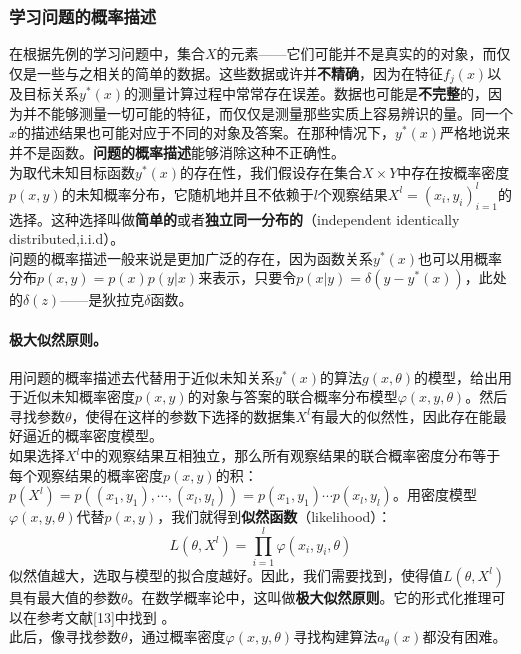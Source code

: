 \documentclass[a4paper,12pt]{ctexart}
\begin{document}
	\subsubsection{学习问题的概率描述}
	在根据先例的学习问题中，集合$X$的元素——它们可能并不是真实的的对象，而仅仅是一些与之相关的简单的数据。这些数据或许并\textbf{不精确}，因为在特征$f_j(x)$以及目标关系$y^*(x)$的测量计算过程中常常存在误差。数据也可能是\textbf{不完整}的，因为并不能够测量一切可能的特征，而仅仅是测量那些实质上容易辨识的量。同一个$x$的描述结果也可能对应于不同的对象及答案。在那种情况下，$y^*(x)$严格地说来并不是函数。\textbf{问题的概率描述}能够消除这种不正确性。\\
	\indent 为取代未知目标函数$y^*(x)$的存在性，我们假设存在集合$X\times Y$中存在按概率密度$p(x,y)$的未知概率分布，它随机地并且不依赖于$l$个观察结果$X^l=(x_i,y_i)_{i=1}^l$的选择。这种选择叫做\textbf{简单的}或者\textbf{独立同一分布的}（independent identically distributed,i.i.d）。\\
	\indent 问题的概率描述一般来说是更加广泛的存在，因为函数关系$y^*(x)$也可以用概率分布$p(x,y)=p(x)p(y|x)$来表示，只要令$p(x|y)=\delta(y-y^*(x))$，此处的$\delta(z)$——是狄拉克$\delta$函数。\\
	\paragraph{极大似然原则。}用问题的概率描述去代替用于近似未知关系$y^*(x)$的算法$g(x,\theta)$的模型，给出用于近似未知概率密度$p(x,y)$的对象与答案的联合概率分布模型$\varphi(x,y,\theta)$。然后寻找参数$\theta$，使得在这样的参数下选择的数据集$X^l$有最大的似然性，因此存在能最好逼近的概率密度模型。\\
	\indent 如果选择$X^l$中的观察结果互相独立，那么所有观察结果的联合概率密度分布等于每个观察结果的概率密度$p(x,y)$的积：$p(X^l)=p((x_1,y_1),\cdots,(x_l,y_l))=p(x_1,y_1)\cdots p(x_l,y_l)$。用密度模型$\varphi(x,y,\theta)$代替$p(x,y)$，我们就得到\textbf{似然函数}（likelihood）：
	$$
	L(\theta,X^l)=\prod_{i=1}^l\varphi(x_i,y_i,\theta)
	$$
	\indent 似然值越大，选取与模型的拟合度越好。因此，我们需要找到，使得值$L(\theta,X^l)$具有最大值的参数$\theta$。在数学概率论中，这叫做\textbf{极大似然原则}。它的形式化推理可以在参考文献[13]中找到 。\\
	\indent 此后，像寻找参数$\theta$，通过概率密度$\varphi(x,y,\theta)$寻找构建算法$a_{\theta}(x)$都没有困难。
\end{document}
